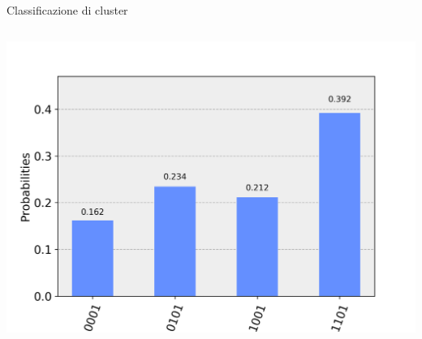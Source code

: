 \documentclass{beamer}
\begin{document}
\begin{frame}{Classificazione di cluster}
\begin{columns}
            \includegraphics[width=.9\linewidth]{gfx/Clusters/Simulated/yellow}
        \end{columns}
    \end{frame}
\end{document}
